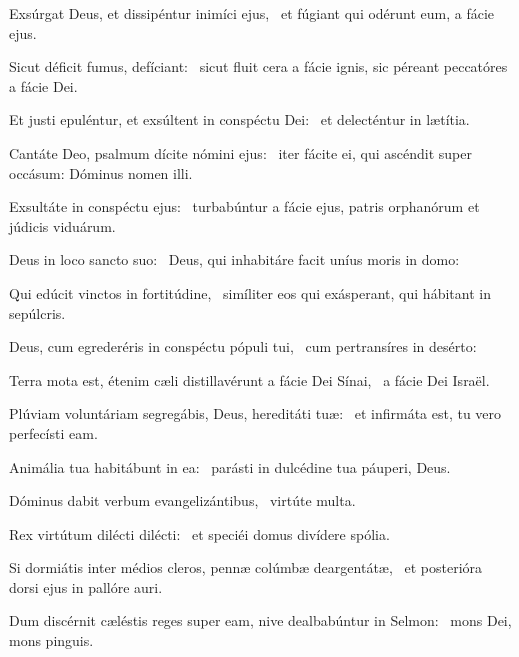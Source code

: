 \item Exsúrgat Deus, et dissipéntur inimíci ejus,~\psstar{} et fúgiant qui odérunt eum, a fácie ejus.

\item Sicut déficit fumus, defí\-ciant:~\psstar{} sicut fluit cera a fácie ignis, sic péreant peccatóres a fácie Dei.

\item Et justi epuléntur, et exsúltent in conspéctu Dei:~\psstar{} et delecténtur in lætítia.

\item Cantáte Deo, psalmum dícite nómini ejus:~\psstar{} iter fácite ei, qui ascéndit super occásum: Dóminus nomen illi.

\item Exsultáte in conspéctu ejus:~\psstar{} turbabúntur a fácie ejus, patris orphanórum et júdicis viduárum.

\item Deus in loco sancto suo:~\psstar{} Deus, qui inhabitáre facit uníus moris in domo:

\item Qui edúcit vinctos in fortitúdine,~\psstar{} simíliter eos qui exásperant, qui hábitant in sepúlcris.

\item Deus, cum egrederéris in conspéctu pópuli tui,~\psstar{} cum pertransíres in desérto:

\item Terra mota est, étenim cæli distillavérunt a fácie Dei Sínai,~\psstar{} a fácie Dei Israël.

\item Plúviam voluntáriam segregábis, Deus, hereditáti tuæ:~\psstar{} et infirmáta est, tu vero perfecísti eam.

\item Animália tua habitábunt in ea:~\psstar{} parásti in dulcédine tua páuperi, Deus.

\item Dóminus dabit verbum evangelizántibus,~\psstar{} virtúte multa.

\item Rex virtútum dilécti dilécti:~\psstar{} et speciéi domus divídere spólia.

\item Si dormiátis inter médios cleros, pennæ colúmbæ deargentátæ,~\psstar{} et posterióra dorsi ejus in pallóre auri.

\item Dum discérnit cæléstis reges super eam, nive dealbabúntur in Selmon:~\psstar{} mons Dei, mons pinguis.

